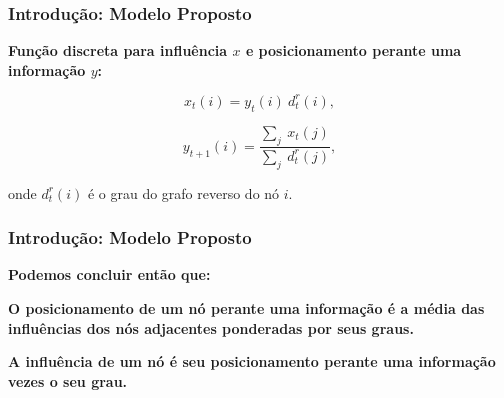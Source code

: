 \begin{frame}
  \frametitle{Introdução: Modelo Proposto}

  \textbf{Função discreta para influência $x$ e posicionamento perante
  uma informação $y$:}

  \begin{alertblock}{}

    \begin{equation}
      x_{t}(i) = y_{t}(i) \  d_{t}^{r}(i),
    \end{equation}

    \begin{equation}
      y_{t+1}(i) = \frac{\sum_{j} \  x_{t}(j)}{\sum_{j} \  d_{t}^{r}(j)},
    \end{equation}

  \end{alertblock}
  \vspace{5mm}

  onde $d_{t}^{r}(i)$ é o grau do grafo reverso do nó $i$.
\end{frame}

\begin{frame}
  \frametitle{Introdução: Modelo Proposto}

  \textbf{Podemos concluir então que:}

  \begin{alertblock}{}
    \vspace{5mm}

    \textbf{\alert{O posicionamento de um nó perante uma informação} é a média das
      influências dos nós adjacentes ponderadas por seus graus.}
    \vspace{5mm}

    \textbf{\alert{A influência de um nó} é seu posicionamento perante uma
      informação vezes o seu grau.}
    \vspace{5mm}
  \end{alertblock}

\end{frame}

